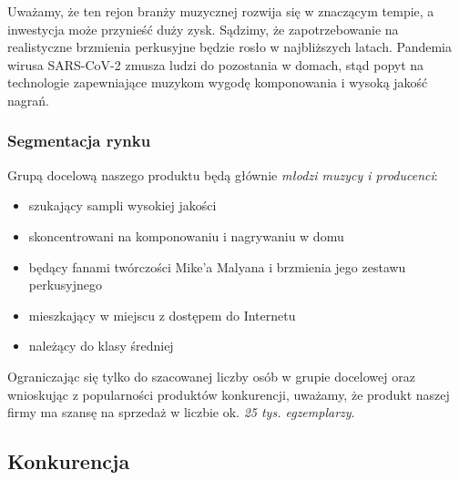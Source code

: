 \documentclass[12pt]{article}
\begin{document}
Uważamy, że ten rejon branży muzycznej rozwija się w znaczącym tempie, a inwestycja może przynieść duży zysk.
Sądzimy, że zapotrzebowanie na realistyczne brzmienia perkusyjne będzie rosło w najbliższych latach.
Pandemia wirusa SARS-CoV-2 zmusza ludzi do pozostania w domach, stąd popyt na technologie zapewniające muzykom wygodę komponowania i wysoką jakość nagrań.


\subsubsection{Segmentacja rynku}


Grupą docelową naszego produktu będą głównie \emph{młodzi muzycy i producenci}:
\begin{itemize}
    \item szukający sampli wysokiej jakości
    \item skoncentrowani na komponowaniu i nagrywaniu w domu
    \item będący fanami twórczości Mike'a Malyana i brzmienia jego zestawu perkusyjnego
    \item mieszkający w miejscu z dostępem do Internetu
    \item należący do klasy średniej
\end{itemize}

Ograniczając się tylko do szacowanej liczby osób w grupie docelowej oraz wnioskując z popularności produktów konkurencji, uważamy, że produkt naszej firmy ma szansę na sprzedaż w liczbie ok. \emph{25 tys. egzemplarzy}.

\subsection{Konkurencja}

\end{document}

